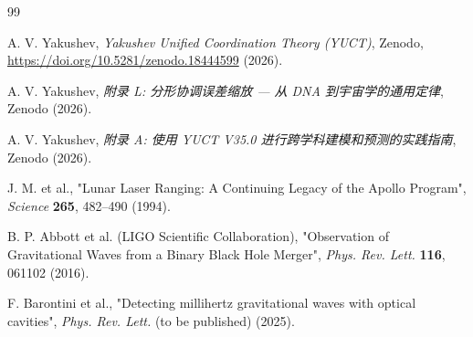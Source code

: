 \documentclass[12pt,a4paper]{article}
\begin{document}
	\begin{thebibliography}{99}
		
		A. V. Yakushev, \emph{Yakushev Unified Coordination Theory (YUCT)}, Zenodo, \url{https://doi.org/10.5281/zenodo.18444599} (2026).
		
		A. V. Yakushev, \emph{附录 L: 分形协调误差缩放 — 从 DNA 到宇宙学的通用定律}, Zenodo (2026).
		
		A. V. Yakushev, \emph{附录 A: 使用 YUCT V35.0 进行跨学科建模和预测的实践指南}, Zenodo (2026).
		
		J. M. et al., "Lunar Laser Ranging: A Continuing Legacy of the Apollo Program", \emph{Science} \textbf{265}, 482–490 (1994).
		
		B. P. Abbott et al. (LIGO Scientific Collaboration), "Observation of Gravitational Waves from a Binary Black Hole Merger", \emph{Phys. Rev. Lett.} \textbf{116}, 061102 (2016).
		
		F. Barontini et al., "Detecting millihertz gravitational waves with optical cavities", \emph{Phys. Rev. Lett.} (to be published) (2025).
		
	\end{thebibliography}
	
\end{document}
